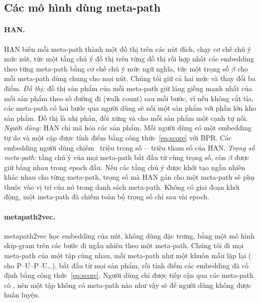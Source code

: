 \subsection{Các mô hình dùng meta-path}
\label{sec:models}

\paragraph{HAN\@.} HAN \citep{wang2019heterogeneous} biến mỗi meta-path thành một đồ thị trên
các nút đích, chạy cơ chế chú ý mức nút, tức một tầng chú ý đồ thị trên từng đồ thị rồi hợp nhất
các embedding theo từng meta-path bằng cơ chế chú ý mức ngữ nghĩa, tức một trọng số $\beta$ cho
mỗi meta-path dùng chung cho mọi nút. Chúng tôi giữ cả hai mức và thay đổi ba điểm.
\emph{Đồ thị:} đồ thị sản phẩm của mỗi meta-path giữ  láng giềng mạnh nhất của
mỗi sản phẩm theo số đường đi (walk count) sau mỗi bước, vì nếu không cắt tỉa, các meta-path có hai
bước qua người dùng sẽ nối một sản phẩm với phần lớn kho sản phẩm. Đồ thị là nhị phân, đối xứng và
cho mỗi sản phẩm một cạnh tự nối. \emph{Người dùng:} HAN chỉ mã hóa các sản phẩm. Mỗi
người dùng có một embedding tự do và một cặp được tính điểm bằng công thức~\eqref{eq:score} với BPR.
Các embedding người dùng chiếm ~triệu trong số
--~triệu tham số của HAN. \emph{Trọng số meta-path:} tầng
chú ý của mọi meta-path bắt đầu từ cùng trọng số, còn $\beta$ được giữ bằng nhau trong
 epoch đầu. Nếu các tầng chú ý được khởi tạo ngẫu nhiên khác nhau cho từng meta-path, trọng số mà HAN gán cho
một meta-path sẽ phụ thuộc vào vị trí của nó trong danh sách meta-path. Không có giai đoạn khởi động, một meta-path đã chiếm toàn bộ
trọng số chỉ sau vài epoch.

\paragraph{metapath2vec.} metapath2vec \citep{dong2017metapath2vec} học embedding của nút, không
dùng đặc trưng, bằng một mô hình skip-gram trên các bước đi ngẫu nhiên theo một meta-path.
Chúng tôi đi mọi meta-path của một tập cùng nhau, mỗi meta-path như một khuôn mẫu lặp lại
( cho P--U--P--U\ldots), bắt đầu từ mọi sản phẩm, rồi tính điểm các embedding đã cố định
bằng công thức~\eqref{eq:score}. Người dùng chỉ được tiếp cận qua các meta-path có , nên
một tập không có meta-path nào như vậy sẽ để người dùng không được huấn luyện.

